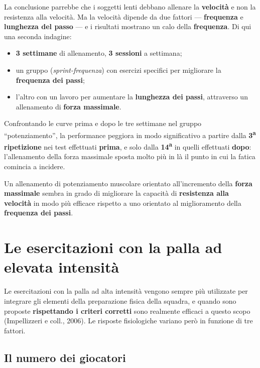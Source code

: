 La conclusione parrebbe che i soggetti lenti debbano allenare la \textbf{velocità} e non la
resistenza alla velocità. Ma la velocità dipende da due fattori --- \textbf{frequenza} e
\textbf{lunghezza del passo} --- e i risultati mostrano un calo della \textbf{frequenza}. Di qui una
seconda indagine:

\begin{itemize}
  \item \textbf{3 settimane} di allenamento, \textbf{3 sessioni} a settimana;
  \item un gruppo (\textit{sprint-frequenza}) con esercizi specifici per migliorare la
    \textbf{frequenza dei passi};
  \item l'altro con un lavoro per aumentare la \textbf{lunghezza dei passi}, attraverso un
    allenamento di \textbf{forza massimale}.
\end{itemize}

Confrontando le curve prima e dopo le tre settimane nel gruppo ``potenziamento'', la performance
peggiora in modo significativo a partire dalla \textbf{3\textsuperscript{a} ripetizione} nei test
effettuati \textbf{prima}, e solo dalla \textbf{14\textsuperscript{a}} in quelli effettuati
\textbf{dopo}: l'allenamento della forza massimale sposta molto più in là il punto in cui la fatica
comincia a incidere.

Un allenamento di potenziamento muscolare orientato all'incremento della \textbf{forza massimale}
sembra in grado di migliorare la capacità di \textbf{resistenza alla velocità} in modo più efficace
rispetto a uno orientato al miglioramento della \textbf{frequenza dei passi}.

\section{Le esercitazioni con la palla ad elevata intensità}

Le esercitazioni con la palla ad alta intensità vengono sempre più utilizzate per integrare gli
elementi della preparazione fisica della squadra, e quando sono proposte \textbf{rispettando i
criteri corretti} sono realmente efficaci a questo scopo (Impellizzeri e coll., 2006). Le risposte
fisiologiche variano però in funzione di tre fattori.

\subsection{Il numero dei giocatori}

